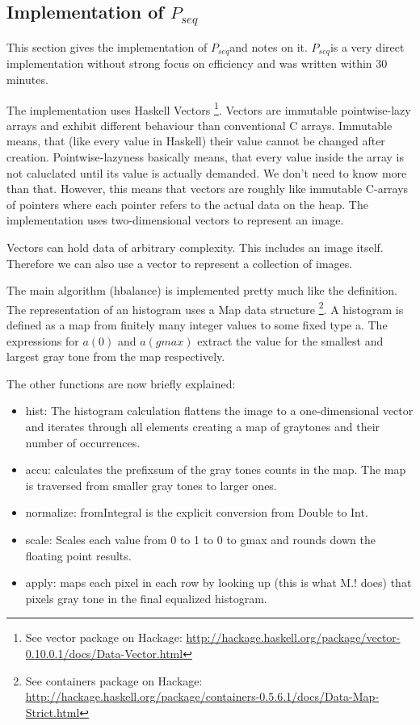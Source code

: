 \documentclass{article}
\newcommand{\seq}[0]{$P_{seq}$}
\begin{document}
    \newpage
    
    \subsection{Implementation of \seq}
      This section gives the implementation of \seq and notes on it.
      \seq is a very direct implementation without strong focus on efficiency and
      was written within 30 minutes.
      
      
      
      The implementation uses Haskell Vectors \footnote[1]{See vector package on Hackage: \url{http://hackage.haskell.org/package/vector-0.10.0.1/docs/Data-Vector.html}}.
      Vectors are immutable pointwise-lazy arrays and
      exhibit different behaviour than conventional C arrays.
      Immutable means, that (like every value in Haskell) their value cannot be changed after creation.
      Pointwise-lazyness basically means, that every value inside the array is not caluclated
      until its value is actually demanded. We don't need to know more than that.
      However, this means that vectors are roughly like immutable C-arrays of pointers
      where each pointer refers to the actual data on the heap.
      The implementation uses two-dimensional vectors to represent an image.
      
      Vectors can hold data of arbitrary complexity. This includes an image itself.
      Therefore we can also use a vector to represent a collection of images.
      
      The main algorithm (hbalance) is implemented pretty much like the definition.
      The representation of an histogram uses a Map data structure \footnote[2]{See containers package on Hackage: \url{http://hackage.haskell.org/package/containers-0.5.6.1/docs/Data-Map-Strict.html}}.
      A histogram is defined as a map from finitely many integer values to some fixed type a.
      The expressions for $a(0)$ and $a(gmax)$ extract the value for the smallest
      and largest gray tone from the map respectively.
      
      The other functions are now briefly explained:
      \begin{itemize}
        \item hist: The histogram calculation flattens the image to a one-dimensional vector and 
          iterates through all elements creating a map of graytones and their number of occurrences.
        \item accu: calculates the prefixsum of the gray tones counts in the map.
          The map is traversed from smaller gray tones to larger ones.
        \item normalize: fromIntegral is the explicit conversion from Double to Int.
        \item scale: Scales each value from 0 to 1 to 0 to gmax and rounds down the floating point results.
        \item apply: maps each pixel in each row by looking up (this is what M.! does) that pixels gray tone in the final equalized histogram.
      \end{itemize}
      
\end{document}
